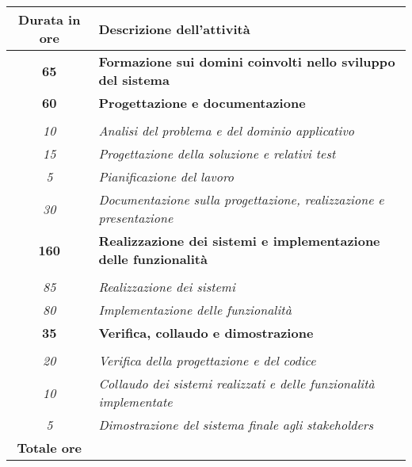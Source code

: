 \begin{tabularx}{\textwidth}{|c|X|}
	\hline
	\textbf{Durata in ore} & \textbf{Descrizione dell'attività} \\\hline
	\textbf{65} & \textbf{Formazione sui domini coinvolti nello sviluppo del sistema} \\	 
    \hline

    \textbf{60} & \textbf{Progettazione e documentazione} \\ \hdashline 
    \multirow{3}{0cm}\\ 
    \textit{10} & 
    \textit{Analisi del problema e del dominio applicativo} \\
    \textit{15} & 
    \textit{Progettazione della soluzione e relativi test} \\
    \textit{5} & 
    \textit{Pianificazione del lavoro} \\
    \textit{30} & 
    \textit{Documentazione sulla progettazione, realizzazione e presentazione} \\
    \hline
    
    \textbf{160} & \textbf{Realizzazione dei sistemi e implementazione delle funzionalità} \\ \hdashline 
    \multirow{3}{0cm}\\ 
    \textit{85} & 
    \textit{Realizzazione dei sistemi} \\
    \textit{80} & 
    \textit{Implementazione delle funzionalità} \\
    \hline

    \textbf{35} & \textbf{Verifica, collaudo e dimostrazione}  \\ \hdashline 
    \multirow{4}{0cm}\\ 
    \textit{20} & 
    \textit{Verifica della progettazione e del codice} \\
    \textit{10} & 
    \textit{Collaudo dei sistemi realizzati e delle funzionalità implementate} \\
    \textit{5} & 
    \textit{Dimostrazione del sistema finale agli stakeholders} \\
    \hline
	
	\textbf{Totale ore} & \multicolumn{1}{|c|}{\textbf{\totaleOre}} \\\hline
\end{tabularx}